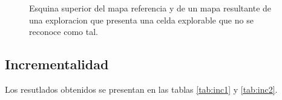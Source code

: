 \begin{figure}[H]
  \centerfloat

  \qquad

  \caption{Esquina superior del mapa referencia y de un mapa resultante de una exploracion que presenta una celda explorable que no se reconoce como tal.}\label{fig:faltaCub}

\end{figure}







\subsection{Incrementalidad}\label{sec:exp:inc}
Los resutlados obtenidos se presentan en las tablas \ref{tab:inc1} y \ref{tab:inc2}.






